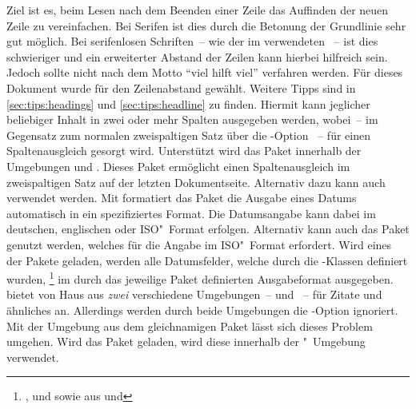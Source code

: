 \begin{DeclarePackages}
  Ziel ist es, beim Lesen nach dem Beenden einer Zeile das Auffinden der neuen 
  Zeile zu vereinfachen. Bei Serifen ist dies durch die Betonung der Grundlinie 
  sehr gut möglich. Bei serifenlosen Schriften~-- wie der im \TUDCD verwendeten 
  \OpenSans~-- ist dies schwieriger und ein erweiterter Abstand der Zeilen kann 
  hierbei hilfreich sein. Jedoch sollte nicht nach dem Motto 
  \enquote{viel hilft viel} verfahren werden. Für dieses Dokument wurde 
   für den Zeilenabstand gewählt. 
  Weitere Tipps sind in \autoref{sec:tips:headings} und   
  \autoref{sec:tips:headline} zu finden.
  Hiermit kann jeglicher beliebiger Inhalt in zwei oder mehr Spalten ausgegeben 
  werden, wobei~-- im Gegensatz zum normalen zweispaltigen Satz über die
  \KOMAScript-Option ~-- für einen Spaltenausgleich gesorgt 
  wird. Unterstützt wird das Paket innerhalb der Umgebungen 
   und .
  Dieses Paket ermöglicht einen Spaltenausgleich im zweispaltigen Satz auf der 
  letzten Dokumentseite. Alternativ dazu kann auch  verwendet 
  werden.
  Mit  formatiert das Paket  
  die Ausgabe eines Datums automatisch in ein spezifiziertes Format. Die 
  Datumsangabe kann dabei im deutschen, englischen oder ISO"~Format erfolgen. 
  Alternativ kann auch das Paket  genutzt werden, welches 
  für  die Angabe im ISO"~Format erfordert. 
  Wird eines der Pakete geladen, werden alle Datumsfelder, welche durch die 
  \TUDScript-Klassen definiert wurden,%
  \footnote{%
    ,  und  sowie aus 
      und %
  }
  im durch das jeweilige Paket definierten Ausgabeformat ausgegeben.
   bietet von Haus aus \emph{zwei} verschiedene Umgebungen~-- 
   und ~-- für Zitate und ähnliches 
  an. Allerdings werden durch beide Umgebungen die \KOMAScript-Option 
   ignoriert. Mit der Umgebung  aus 
  dem gleichnamigen Paket lässt sich dieses Problem umgehen. Wird das Paket 
  geladen, wird diese innerhalb der "~Umgebung verwendet.

\end{DeclarePackages}
